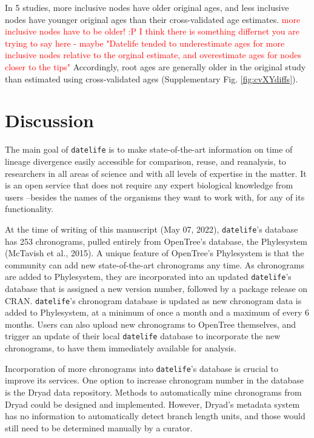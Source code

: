 \documentclass[
  english,
  man]{apa6}
\begin{document}
In 5 studies, more inclusive nodes have older original ages, and less inclusive nodes have younger original ages than their cross-validated age estimates.
\textcolor{red}{more inclusive nodes have to be older! :P I think there is something differnet you are trying to say here - maybe "Datelife tended to underestimate ages for more inclusive nodes relative to the orginal estimate, and overestimate ages for nodes closer to the tips"}
Accordingly, root ages are generally older in the original study than estimated using cross-validated ages (Supplementary Fig. \ref{fig:cvXYdiffs}).

\hypertarget{discussion}{%
\section{Discussion}\label{discussion}}

The main goal of \texttt{datelife} is to make state-of-the-art information on time of lineage divergence easily accessible for comparison, reuse, and reanalysis, to researchers in all areas of science and with all levels of expertise in the matter. It is an open service that does not require any expert biological knowledge from users --besides the names of the organisms they want to work with, for any of its functionality.

At the time of writing of this manuscript (May 07, 2022), \texttt{datelife}'s database has 253 chronograms, pulled entirely from OpenTree's database, the Phylesystem (McTavish et al., 2015). A unique feature of OpenTree's Phylesystem is that the community can add new state-of-the-art chronograms any time. As chronograms are added to Phylesystem, they are incorporated into an updated \texttt{datelife}'s database that is assigned a new version number, followed by a package release on CRAN. \texttt{datelife}'s chronogram database is updated as new chronogram data is added to Phylesystem, at a minimum of once a month and a maximum of every 6 months.
Users can also upload new chronograms to OpenTree themselves, and trigger an update of their local \texttt{datelife} database to incorporate the new chronograms, to have them immediately available for analysis.

Incorporation of more chronograms into \texttt{datelife}'s database is crucial to improve its services. One option to increase chronogram number in the database is the Dryad data repository. Methods to automatically mine chronograms from Dryad could be designed and implemented. However, Dryad's metadata system has no information to automatically detect branch length units, and those would still need to be determined manually by a curator.
\end{document}
